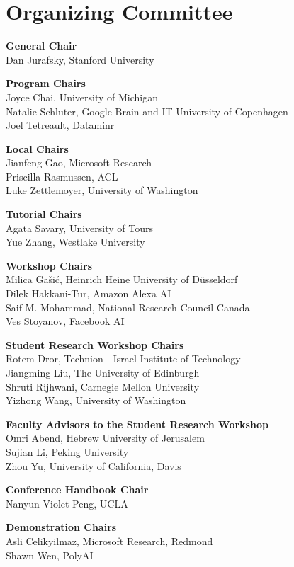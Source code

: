 \markboth{}{} %
\markright{}{} %
\newcommand{\aclitem}[1][]{{\bf #1}\\}

\section{Organizing Committee}{}

\setlength{\parindent}{0pt}

\aclitem[General Chair]
Dan Jurafsky, Stanford University

\aclitem[Program Chairs]
Joyce Chai, University of Michigan\\
Natalie Schluter, Google Brain and IT University of Copenhagen\\
Joel Tetreault, Dataminr

\aclitem[Local Chairs]
Jianfeng Gao, Microsoft Research\\
Priscilla Rasmussen, ACL\\
Luke Zettlemoyer, University of Washington

\aclitem[Tutorial Chairs]
Agata Savary, University of Tours\\
Yue Zhang, Westlake University

\aclitem[Workshop Chairs]
Milica Ga\v{s}i\'{c}, Heinrich Heine University of D\"{u}sseldorf\\
Dilek Hakkani-Tur, Amazon Alexa AI\\
Saif M. Mohammad, National Research Council Canada\\
Ves Stoyanov, Facebook AI

\aclitem[Student Research Workshop Chairs]
Rotem Dror, Technion - Israel Institute of Technology\\
Jiangming Liu, The University of Edinburgh\\
Shruti Rijhwani, Carnegie Mellon University\\
Yizhong Wang, University of Washington

\aclitem[Faculty Advisors to the Student Research Workshop]
Omri Abend, Hebrew University of Jerusalem\\
Sujian Li, Peking University\\
Zhou Yu, University of California, Davis

\aclitem[Conference Handbook Chair]
Nanyun Violet Peng, UCLA

\aclitem[Demonstration Chairs]
Asli Celikyilmaz, Microsoft Research, Redmond\\
Shawn Wen, PolyAI

